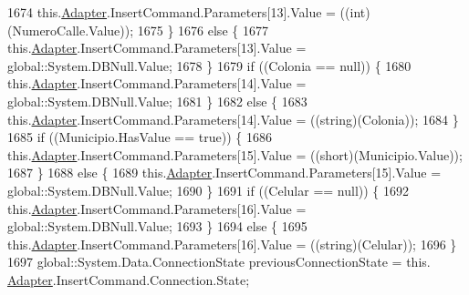 \begin{DoxyCode}
1674                 this.\hyperlink{class_proyecto___integrador__3_1_1ds_usuarios_table_adapters_1_1_usuarios_table_adapter_a46252bad9dadbf20130beca25d50b5bc}{Adapter}.InsertCommand.Parameters[13].Value = ((int)(NumeroCalle.Value));
1675             \}
1676             \textcolor{keywordflow}{else} \{
1677                 this.\hyperlink{class_proyecto___integrador__3_1_1ds_usuarios_table_adapters_1_1_usuarios_table_adapter_a46252bad9dadbf20130beca25d50b5bc}{Adapter}.InsertCommand.Parameters[13].Value = global::System.DBNull.Value;
1678             \}
1679             \textcolor{keywordflow}{if} ((Colonia == null)) \{
1680                 this.\hyperlink{class_proyecto___integrador__3_1_1ds_usuarios_table_adapters_1_1_usuarios_table_adapter_a46252bad9dadbf20130beca25d50b5bc}{Adapter}.InsertCommand.Parameters[14].Value = global::System.DBNull.Value;
1681             \}
1682             \textcolor{keywordflow}{else} \{
1683                 this.\hyperlink{class_proyecto___integrador__3_1_1ds_usuarios_table_adapters_1_1_usuarios_table_adapter_a46252bad9dadbf20130beca25d50b5bc}{Adapter}.InsertCommand.Parameters[14].Value = ((string)(Colonia));
1684             \}
1685             \textcolor{keywordflow}{if} ((Municipio.HasValue == \textcolor{keyword}{true})) \{
1686                 this.\hyperlink{class_proyecto___integrador__3_1_1ds_usuarios_table_adapters_1_1_usuarios_table_adapter_a46252bad9dadbf20130beca25d50b5bc}{Adapter}.InsertCommand.Parameters[15].Value = ((short)(Municipio.Value));
1687             \}
1688             \textcolor{keywordflow}{else} \{
1689                 this.\hyperlink{class_proyecto___integrador__3_1_1ds_usuarios_table_adapters_1_1_usuarios_table_adapter_a46252bad9dadbf20130beca25d50b5bc}{Adapter}.InsertCommand.Parameters[15].Value = global::System.DBNull.Value;
1690             \}
1691             \textcolor{keywordflow}{if} ((Celular == null)) \{
1692                 this.\hyperlink{class_proyecto___integrador__3_1_1ds_usuarios_table_adapters_1_1_usuarios_table_adapter_a46252bad9dadbf20130beca25d50b5bc}{Adapter}.InsertCommand.Parameters[16].Value = global::System.DBNull.Value;
1693             \}
1694             \textcolor{keywordflow}{else} \{
1695                 this.\hyperlink{class_proyecto___integrador__3_1_1ds_usuarios_table_adapters_1_1_usuarios_table_adapter_a46252bad9dadbf20130beca25d50b5bc}{Adapter}.InsertCommand.Parameters[16].Value = ((string)(Celular));
1696             \}
1697             global::System.Data.ConnectionState previousConnectionState = this.
      \hyperlink{class_proyecto___integrador__3_1_1ds_usuarios_table_adapters_1_1_usuarios_table_adapter_a46252bad9dadbf20130beca25d50b5bc}{Adapter}.InsertCommand.Connection.State;

\end{DoxyCode}
